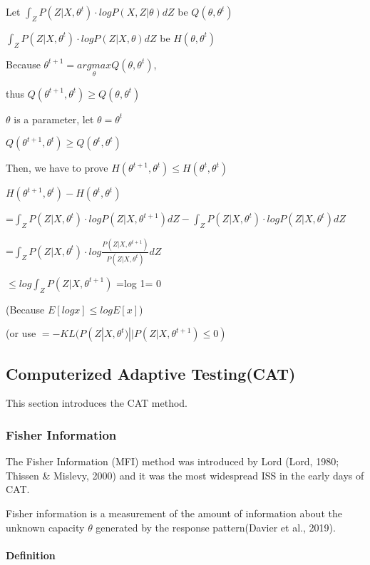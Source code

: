\documentclass[
]{article}
\begin{document}
\quad Let \(\int_Z P(Z|X,\theta^t)\cdot logP(X,Z|\theta)dZ\) be
\(Q(\theta, \theta^t)\)

\quad \(\int_Z P(Z|X,\theta^t)\cdot logP(Z|X,\theta)dZ\) be
\(H(\theta, \theta^t)\)

Because \(\theta^{t+1}=\underset {\theta}{argmax}Q(\theta, \theta^t)\),

thus \(Q(\theta^{t+1}, \theta^t)\geq Q(\theta, \theta^t)\)

\(\theta\) is a parameter, let \(\theta=\theta^t\)

\(Q(\theta^{t+1}, \theta^t)\geq Q(\theta^t, \theta^t)\)

Then, we have to prove
\(H(\theta^{t+1}, \theta^t)\leq H(\theta^t, \theta^t)\)

\(H(\theta^{t+1}, \theta^t)-H(\theta^t, \theta^t)\)

=\(\int_Z P(Z|X,\theta^t)\cdot logP(Z|X,\theta^{t+1})dZ-\int_Z P(Z|X,\theta^t)\cdot logP(Z|X,\theta^t)dZ\)

=\(\int_Z P(Z|X,\theta^t)\cdot log\frac {P(Z|X,\theta^{t+1})}{P(Z|X,\theta^t)}dZ\)

\(\leq log \int_Z P(Z|X,\theta^{t+1})\) =log 1= 0

(Because \(E[log x]\leq logE[x]\))

(or use \(=-KL(P(Z|X,\theta^t)||P(Z|X,\theta^{t+1})\leq 0)\)

\hypertarget{computerized-adaptive-testingcat}{%
\subsection{Computerized Adaptive
Testing(CAT)}\label{computerized-adaptive-testingcat}}

This section introduces the CAT method.

\hypertarget{fisher-information}{%
\subsubsection{Fisher Information}\label{fisher-information}}

The Fisher Information (MFI) method was introduced by Lord (Lord, 1980;
Thissen \& Mislevy, 2000) and it was the most widespread ISS in the
early days of CAT.

Fisher information is a measurement of the amount of information about
the unknown capacity \(\theta\) generated by the response pattern(Davier
et al., 2019).

\hypertarget{definition-1}{%
\paragraph{Definition}\label{definition-1}}
\end{document}
